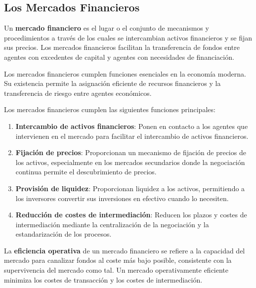 \subsection{Los Mercados Financieros}

\begin{definicion}
Un \textbf{mercado financiero} es el lugar o el conjunto de mecanismos y procedimientos a través de los cuales se intercambian activos financieros y se fijan sus precios. Los mercados financieros facilitan la transferencia de fondos entre agentes con excedentes de capital y agentes con necesidades de financiación.
\end{definicion}

Los mercados financieros cumplen funciones esenciales en la economía moderna. Su existencia permite la asignación eficiente de recursos financieros y la transferencia de riesgo entre agentes económicos.

\begin{teorema}
Los mercados financieros cumplen las siguientes funciones principales:

\begin{enumerate}
\item \textbf{Intercambio de activos financieros}: Ponen en contacto a los agentes que intervienen en el mercado para facilitar el intercambio de activos financieros.

\item \textbf{Fijación de precios}: Proporcionan un mecanismo de fijación de precios de los activos, especialmente en los mercados secundarios donde la negociación continua permite el descubrimiento de precios.

\item \textbf{Provisión de liquidez}: Proporcionan liquidez a los activos, permitiendo a los inversores convertir sus inversiones en efectivo cuando lo necesiten.

\item \textbf{Reducción de costes de intermediación}: Reducen los plazos y costes de intermediación mediante la centralización de la negociación y la estandarización de los procesos.
\end{enumerate}
\end{teorema}

\begin{definicion}
La \textbf{eficiencia operativa} de un mercado financiero se refiere a la capacidad del mercado para canalizar fondos al coste más bajo posible, consistente con la supervivencia del mercado como tal. Un mercado operativamente eficiente minimiza los costes de transacción y los costes de intermediación.
\end{definicion}

